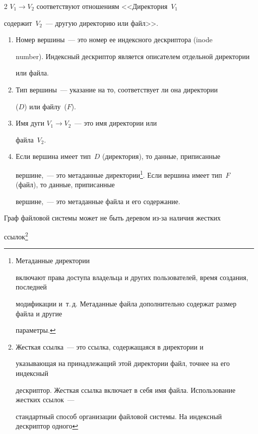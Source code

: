 \begin{multicols}{2}
$V_1\rightarrow V_2$ соответствуют отношениям <<Директория~$V_1$ 


содержит~$V_2$~--- другую директорию или файл>>. 


\begin{enumerate}[1.]


\item Номер вершины~--- это номер ее индексного дескриптора (inode 


number). Индексный дескриптор является описателем отдельной директории 


или файла.\\[-14pt]


\item Тип вершины~--- указание на то, соответствует ли она директории 


($D$) или файлу~($F$).\\[-14pt]


\item Имя дуги $V_1\rightarrow V_2$~--- это имя директории или 


файла~$V_2$.\\[-14pt]


\item Если вершина имеет тип~$D$ (директория), то данные, приписанные 


вершине,~--- это метаданные директории\footnote{Метаданные директории 


включают права доступа владельца и других пользователей, время создания, последней 


модификации и~т.\,д. Метаданные файла дополнительно содержат размер файла и другие 


параметры.}. Если вершина имеет тип~$F$ (файл), то данные, приписанные 


вершине,~--- это метаданные файла и его содержание.


\end{enumerate}





      Граф файловой системы может не быть деревом из-за наличия жестких 


ссылок\footnote{Жесткая ссылка~--- это ссылка, содержащаяся в директории и 


указывающая на принадлежащий этой директории файл, точнее на его индексный 


дескриптор. Жесткая ссылка включает в себя имя файла. Использование жестких ссылок~--- 


стандартный способ организации файловой системы. На индексный дескриптор одного 


}
\end{multicols}
